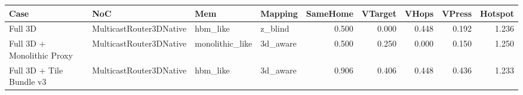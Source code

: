 \begin{tabular}{l l l l r r r r r}
\hline
Case & NoC & Mem & Mapping & SameHome & VTarget & VHops & VPress & Hotspot \\
\hline
Full 3D & MulticastRouter3DNative & hbm\_like & z\_blind & 0.500 & 0.000 & 0.448 & 0.192 & 1.236 \\
Full 3D + Monolithic Proxy & MulticastRouter3DNative & monolithic\_like & 3d\_aware & 0.500 & 0.250 & 0.000 & 0.150 & 1.250 \\
Full 3D + Tile Bundle v3 & MulticastRouter3DNative & hbm\_like & 3d\_aware & 0.906 & 0.406 & 0.448 & 0.436 & 1.233 \\
\hline
\end{tabular}
